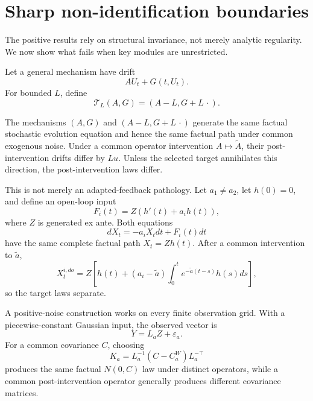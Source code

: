 \section{Sharp non-identification boundaries}\label{sec:nonid}

The positive results rely on structural invariance, not merely analytic regularity. We now show what fails when key modules are unrestricted.

Let a general mechanism have drift
\[
 AU_t+G(t,U_t).
\]
For bounded $L$, define
\[
 \mathcal T_L(A,G)=(A-L,G+L\,\cdot).
\]

\begin{theorem}\label{thm:gauge-main}
The mechanisms $(A,G)$ and $(A-L,G+L\,\cdot)$ generate the same factual stochastic evolution equation and hence the same factual path under common exogenous noise. Under a common operator intervention $A\mapsto\widetilde A$, their post-intervention drifts differ by $Lu$. Unless the selected target annihilates this direction, the post-intervention laws differ.
\end{theorem}

This is not merely an adapted-feedback pathology. Let $a_1\ne a_2$, let $h(0)=0$, and define an open-loop input
\[
 F_i(t)=Z(h'(t)+a_ih(t)),
\]
where $Z$ is generated ex ante. Both equations
\[
 dX_t=-a_iX_tdt+F_i(t)dt
\]
have the same complete factual path $X_t=Zh(t)$. After a common intervention to $\widetilde a$,
\[
 X_t^{i,do}
 =Z\left[
 h(t)+(a_i-\widetilde a)\int_0^te^{-\widetilde a(t-s)}h(s)ds
 \right],
\]
so the target laws separate.

A positive-noise construction works on every finite observation grid. With a piecewise-constant Gaussian input, the observed vector is
\[
 Y=L_aZ+\varepsilon_a.
\]
For a common covariance $C$, choosing
\[
 K_a=L_a^{-1}(C-C_a^W)L_a^{-\top}
\]
produces the same factual $N(0,C)$ law under distinct operators, while a common post-intervention operator generally produces different covariance matrices.

